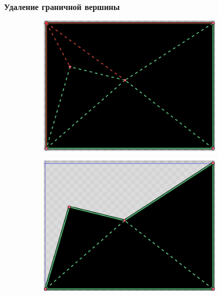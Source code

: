 \documentclass[10pt, unicode]{beamer}
\begin{document}
    \begin{frame}
        \frametitle{Удаление граничной вершины}
        \begin{figure}[H]
            \centering
            \begin{subfigure}{\linewidth}
                \centering
                \includegraphics[scale=0.225]{DeleteBoundary1.png}
            \end{subfigure}
            \begin{subfigure}[H]{0.49\linewidth}
                \centering
                \includegraphics[scale=0.225]{DeleteBoundary2.png}
            \end{subfigure}
            \begin{subfigure}{0.49\linewidth}

\end{subfigure}
\end{figure}
\end{frame}
\end{document}
